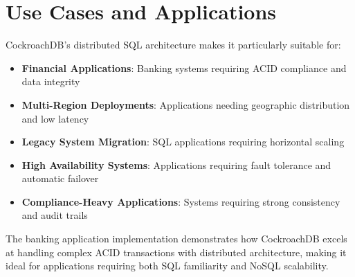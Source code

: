 \section{Use Cases and Applications}

CockroachDB's distributed SQL architecture makes it particularly suitable for:

\begin{itemize}
    \item \textbf{Financial Applications}: Banking systems requiring ACID compliance and data integrity
    \item \textbf{Multi-Region Deployments}: Applications needing geographic distribution and low latency
    \item \textbf{Legacy System Migration}: SQL applications requiring horizontal scaling
    \item \textbf{High Availability Systems}: Applications requiring fault tolerance and automatic failover
    \item \textbf{Compliance-Heavy Applications}: Systems requiring strong consistency and audit trails
\end{itemize}

The banking application implementation demonstrates how CockroachDB excels at handling complex ACID transactions with distributed architecture, making it ideal for applications requiring both SQL familiarity and NoSQL scalability.